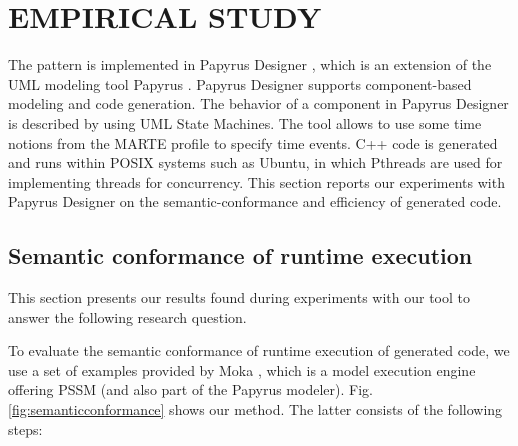 \section{\uppercase{Empirical Study}}
\label{sec:exp}
The pattern is implemented in Papyrus Designer \cite{PapyrusDesigner}, which is an extension of the UML modeling tool Papyrus \cite{cealistpapyrus}.
Papyrus Designer supports component-based modeling and code generation. 
The behavior of a component in Papyrus Designer is described by using UML State Machines.
The tool allows to use some time notions from the MARTE profile to specify time events.
C++ code is generated and runs within POSIX systems such as Ubuntu, in which Pthreads are used for implementing threads for concurrency. 
This section reports our experiments with Papyrus Designer on the semantic-conformance and efficiency of generated code.

\subsection{Semantic conformance of runtime execution}
\label{subsec:exp1}
This section presents our results found during experiments with our tool to answer the following research question.

\noindent
	\begin{mdframed}[backgroundcolor=blue!5]
		\small
		 
	\end{mdframed}


To evaluate the semantic conformance of runtime execution of generated code, we use a set of examples provided by Moka \cite{moka}, which is a model execution engine offering PSSM (and also part of the Papyrus modeler). 
Fig. \ref{fig:semanticconformance} shows our method. 
The latter consists of the following steps:

